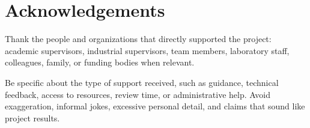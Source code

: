 \chapter*{Acknowledgements}

Thank the people and organizations that directly supported the project: academic supervisors, industrial supervisors, team members, laboratory staff, colleagues, family, or funding bodies when relevant.

Be specific about the type of support received, such as guidance, technical feedback, access to resources, review time, or administrative help. Avoid exaggeration, informal jokes, excessive personal detail, and claims that sound like project results.

\clearpage